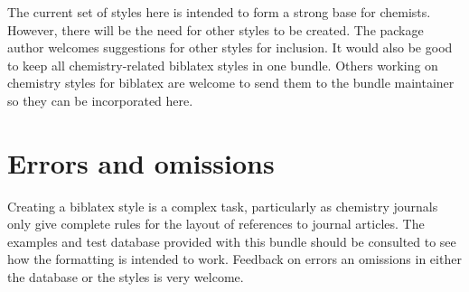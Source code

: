 \documentclass[a4paper]{article}
\begin{document}
The current set of styles here is intended to form a strong base
for chemists.  However, there will be the need for other styles
to be created. The package author welcomes suggestions for other
styles for inclusion.  It would also be good to keep all 
chemistry-related \textsf{biblatex} styles in one bundle. Others
working on chemistry styles for \textsf{biblatex} are welcome to
send them to the bundle maintainer so they can be incorporated 
here.

\section{Errors and omissions}

Creating a \textsf{biblatex} style is a complex task, 
particularly as chemistry journals only give complete rules
for the layout of references to journal articles.  The 
examples and test database provided with this bundle should be
consulted to see how the formatting is intended to work.  
Feedback on errors an omissions in either the database or the 
styles is very welcome.

\printbibliography
\end{document}
